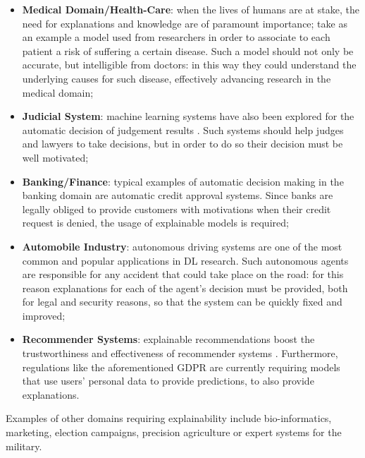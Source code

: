 \begin{itemize}
	\item \textbf{Medical Domain/Health-Care}: when the lives of humans are at stake, the need for explanations and knowledge are of paramount importance; take as an example a model used from researchers in order to associate to each patient a risk of suffering a certain disease. Such a model should not only be accurate, but intelligible from doctors: in this way they could understand the underlying causes for such disease, effectively advancing research in the medical domain;
	\item \textbf{Judicial System}: machine learning systems have also been explored for the automatic decision of judgement results \cite{chen2019judicial}. Such systems should help judges and lawyers to take decisions, but in order to do so their decision must be well motivated;
	\item \textbf{Banking/Finance}: typical examples of automatic decision making in the banking domain are automatic credit approval systems. Since banks are legally obliged to provide customers with motivations when their credit request is denied, the usage of explainable models is required;
	\item \textbf{Automobile Industry}: autonomous driving systems are one of the most common and popular applications in DL research. Such autonomous agents are responsible for any accident that could take place on the road: for this reason explanations for each of the agent's decision must be provided, both for legal and security reasons, so that the system can be quickly fixed and improved;
	\item \textbf{Recommender Systems}: explainable recommendations boost the trustworthiness and effectiveness of recommender systems \cite{zhang2018explainable}. Furthermore, regulations like the aforementioned GDPR are currently requiring models that use users' personal data to provide predictions, to also provide explanations.
\end{itemize}
Examples of other domains requiring explainability include bio-informatics, marketing, election campaigns, precision agriculture or expert systems for the military.
